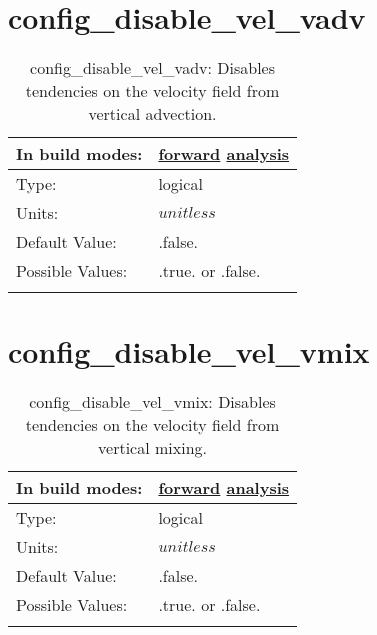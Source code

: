 \section[config\_disable\_vel\_vadv]{config\_disable\_vel\_vadv}
\label{sec:nm_sec_config_disable_vel_vadv}
\begin{center}
\begin{longtable}{| p{2.0in} || p{4.0in} |}
    \hline
    In build modes: & \hyperref[subsec:forward_nm_tab_debug]{forward} \hyperref[subsec:analysis_nm_tab_debug]{analysis} \\
    \hline
    Type: & logical \\
    \hline
    Units: & $unitless$ \\
    \hline
    Default Value: & .false. \\
    \hline
    Possible Values: & .true. or .false. \\
    \hline
    \caption{config\_disable\_vel\_vadv: Disables tendencies on the velocity field from vertical advection.}
\end{longtable}
\end{center}
\section[config\_disable\_vel\_vmix]{config\_disable\_vel\_vmix}
\label{sec:nm_sec_config_disable_vel_vmix}
\begin{center}
\begin{longtable}{| p{2.0in} || p{4.0in} |}
    \hline
    In build modes: & \hyperref[subsec:forward_nm_tab_debug]{forward} \hyperref[subsec:analysis_nm_tab_debug]{analysis} \\
    \hline
    Type: & logical \\
    \hline
    Units: & $unitless$ \\
    \hline
    Default Value: & .false. \\
    \hline
    Possible Values: & .true. or .false. \\
    \hline
    \caption{config\_disable\_vel\_vmix: Disables tendencies on the velocity field from vertical mixing.}
\end{longtable}
\end{center}
